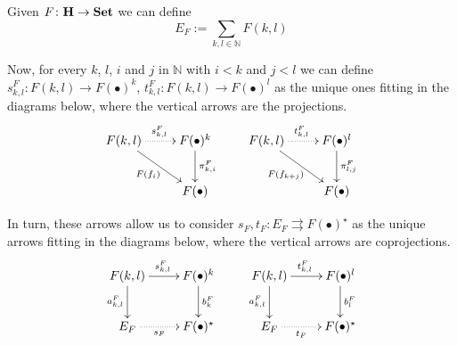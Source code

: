 \documentclass[runningheads,envcountsect]{lipics-v2021}
\newcommand{\catname}[1]{\textbf{\textup{#1}}}
\begin{document}
Given $F\colon \catname{H}\to \catname{Set}$ we can define
\[E_F:=\sum_{k,l\in \mathbb{N}}F(k,l)\]

Now, for every $k$, $l$, $i$ and $j$ in $\mathbb{N}$ with $i< k$ and $j< l$ we can define $s^F_{k,l}\colon F(k,l)\to F(\bullet)^k$,  $t^F_{k,l}\colon F(k,l)\to F(\bullet)^l$ as the unique ones fitting in the diagrams below, where the vertical arrows are the projections.
\[\xymatrix{F(k,l)  \ar@{.>}[r]^{s^F_{k,l}} \ar[dr]_{F(f_i)}& F(\bullet)^{k} \ar[d]^{\pi^F_{k,i}} & F(k,l) \ar@{.>}[r]^{t^F_{k,l}} \ar[dr]_{F(f_{k+j})} & F(\bullet)^{l} \ar[d]^{\pi^F_{l,j}} \\ & F(\bullet) && F(\bullet)}\]

In turn, these arrows allow us to consider
$s_F, t_F\colon E_F\rightrightarrows F(\bullet)^{\star}$ as the unique arrows fitting in the diagrams below, where the vertical arrows are coprojections.
\[\xymatrix{F(k,l) \ar[d]_{a^F_{k,l}}  \ar[r]^{s^{F}_{k,l}}& F(\bullet)^{k} \ar[d]^{b^F_{k}} & F(k,l) \ar[d]_{a^F_{k,l}}  \ar[r]^{t^{F}_{k,l}}& F(\bullet)^{l} \ar[d]^{b^F_{l}}\\ E_F \ar@{.>}[r]_-{s_F}& F(\bullet)^\star & E_F \ar@{.>}[r]_-{t_F}& F(\bullet)^\star}\]
\end{document}
